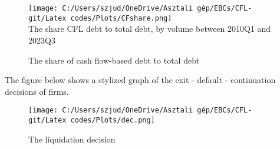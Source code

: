 \documentclass[12pt]{article}
\begin{document}
\begin{figure}[H]  %
    \centering
    \caption{The share of cash flow-based debt to total debt} \label{chart:CFLshare}
    \texttt{[image: C:/Users/szjud/OneDrive/Asztali gép/EBCs/CFL-git/Latex codes/Plots/CFshare.png]} \\
     \small The share CFL debt to total debt, by volume between 2010Q1 and 2023Q3
\end{figure}

\noindent The figure below shows a stylized graph of the exit - default - continuation decisions of firms. 
\begin{figure}[H]  %
    \centering
    \caption{The liquidation decision} \label{chart:DEC}
    \texttt{[image: C:/Users/szjud/OneDrive/Asztali gép/EBCs/CFL-git/Latex codes/Plots/dec.png]}
\end{figure}
\end{document}
